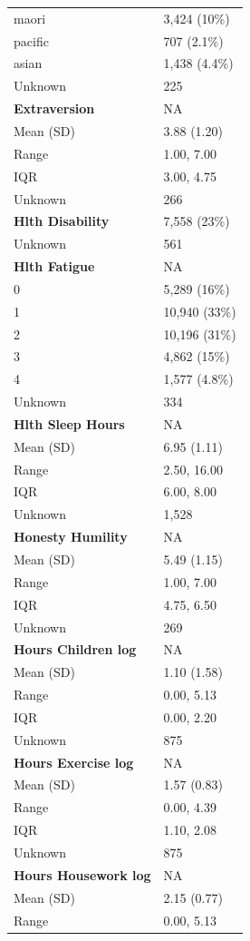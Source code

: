 \documentclass[
  single column]{article}
\begin{document}
\begin{longtable}[]{@{}ll@{}}
maori & 3,424 (10\%) \\
pacific & 707 (2.1\%) \\
asian & 1,438 (4.4\%) \\
Unknown & 225 \\
\textbf{Extraversion} & NA \\
Mean (SD) & 3.88 (1.20) \\
Range & 1.00, 7.00 \\
IQR & 3.00, 4.75 \\
Unknown & 266 \\
\textbf{Hlth Disability} & 7,558 (23\%) \\
Unknown & 561 \\
\textbf{Hlth Fatigue} & NA \\
0 & 5,289 (16\%) \\
1 & 10,940 (33\%) \\
2 & 10,196 (31\%) \\
3 & 4,862 (15\%) \\
4 & 1,577 (4.8\%) \\
Unknown & 334 \\
\textbf{Hlth Sleep Hours} & NA \\
Mean (SD) & 6.95 (1.11) \\
Range & 2.50, 16.00 \\
IQR & 6.00, 8.00 \\
Unknown & 1,528 \\
\textbf{Honesty Humility} & NA \\
Mean (SD) & 5.49 (1.15) \\
Range & 1.00, 7.00 \\
IQR & 4.75, 6.50 \\
Unknown & 269 \\
\textbf{Hours Children log} & NA \\
Mean (SD) & 1.10 (1.58) \\
Range & 0.00, 5.13 \\
IQR & 0.00, 2.20 \\
Unknown & 875 \\
\textbf{Hours Exercise log} & NA \\
Mean (SD) & 1.57 (0.83) \\
Range & 0.00, 4.39 \\
IQR & 1.10, 2.08 \\
Unknown & 875 \\
\textbf{Hours Housework log} & NA \\
Mean (SD) & 2.15 (0.77) \\
Range & 0.00, 5.13 \\

\end{longtable}
\end{document}
